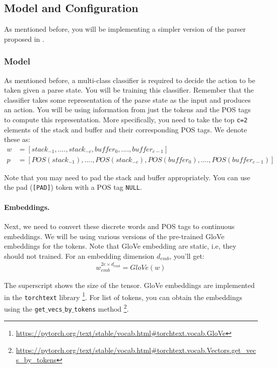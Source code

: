 \subsection{Model and Configuration}
As mentioned before, you will be implementing a simpler version of the parser proposed in \cite{chen2014fast}.
\subsubsection{Model}
 As mentioned before, a multi-class classifier is required to decide the action to be taken given a parse state. You will be training this classifier. Remember that the classifier takes some representation of the parse state as the input and produces an action. You will be using information from just the tokens and the POS tags to compute this representation. More specifically, you need to take the top \texttt{c=2} elements of the stack and buffer and their corresponding POS tags. We denote these as: 
 \begin{align*}
     w &= [stack_{-1},....,stack_{-c}, buffer_0, ...., buffer_{c-1}] \\
     p &= [POS(stack_{-1}),....,POS(stack_{-c}), POS(buffer_0), ...., POS(buffer_{c-1})]
 \end{align*}

Note that you may need to pad the stack and buffer appropriately. You can use the pad (\texttt{[PAD]}) token with a POS tag \texttt{NULL}. 

\paragraph{Embeddings.}
Next, we need to convert these discrete words and POS tags to continuous embeddings. We will be using various versions of the pre-trained GloVe embeddings for the tokens. Note that GloVe embedding are static, i.e, they should not trained. For an embedding dimension $d_{emb}$, you'll get: 
\begin{align*}
    w_{emb}^{2c \times d_{emb}} = GloVe(w)
\end{align*}

The superscript shows the size of the tensor. GloVe embeddings are implemented in the \texttt{torchtext} library \footnote{\url{https://pytorch.org/text/stable/vocab.html\#torchtext.vocab.GloVe}}. For list of tokens, you can obtain the embeddings using the \texttt{get$\_$vecs$\_$by$\_$tokens} method \footnote{\url{https://pytorch.org/text/stable/vocab.html\#torchtext.vocab.Vectors.get_vecs_by_tokens}}. 

